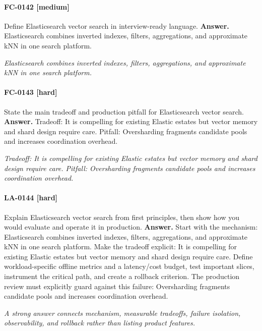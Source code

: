 \paragraph{FC-0142 [medium]} Define Elasticsearch vector search in interview-ready language.
\noindent\textbf{Answer.} Elasticsearch combines inverted indexes, filters, aggregations, and approximate kNN in one search platform.
\par\textit{Elasticsearch combines inverted indexes, filters, aggregations, and approximate kNN in one search platform.}
\paragraph{FC-0143 [hard]} State the main tradeoff and production pitfall for Elasticsearch vector search.
\noindent\textbf{Answer.} Tradeoff: It is compelling for existing Elastic estates but vector memory and shard design require care. Pitfall: Oversharding fragments candidate pools and increases coordination overhead.
\par\textit{Tradeoff: It is compelling for existing Elastic estates but vector memory and shard design require care. Pitfall: Oversharding fragments candidate pools and increases coordination overhead.}
\paragraph{LA-0144 [hard]} Explain Elasticsearch vector search from first principles, then show how you would evaluate and operate it in production.
\noindent\textbf{Answer.} Start with the mechanism: Elasticsearch combines inverted indexes, filters, aggregations, and approximate kNN in one search platform. Make the tradeoff explicit: It is compelling for existing Elastic estates but vector memory and shard design require care. Define workload-specific offline metrics and a latency/cost budget, test important slices, instrument the critical path, and create a rollback criterion. The production review must explicitly guard against this failure: Oversharding fragments candidate pools and increases coordination overhead.
\par\textit{A strong answer connects mechanism, measurable tradeoffs, failure isolation, observability, and rollback rather than listing product features.}
